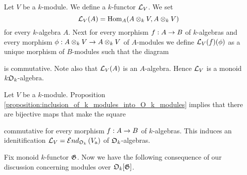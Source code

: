\begin{example}\label{example:general_linear_monoid}
Let $V$ be a $k$-module. We define a $k$-functor ${\mathcal L}_V$. We set
$${\mathcal L}_V(A) = \mathrm{Hom}_A(A\otimes_kV,A\otimes_kV)$$
for every $k$-algebra $A$. Next for every morphism $f:A\rightarrow B$ of $k$-algebras and every morphism $\phi:A\otimes_kV\rightarrow A\otimes_kV$ of $A$-modules we define ${\mathcal L}_V(f)(\phi)$ as a unique morphism of $B$-modules such that the diagram
\begin{center}
\end{center}
is commutative. Note also that ${\mathcal L}_V(A)$ is an $A$-algebra. Hence ${\mathcal L}_V$ is a monoid $k{\mathfrak O}_k$-algebra.
\end{example}

\begin{remark}\label{remark:general_linear_monoid}
Let $V$ be a $k$-module. Proposition \ref{proposition:inclusion_of_k_modules_into_O_k_modules} implies that there are bijective maps that make the square
\begin{center}
\end{center}
commutative for every morphism $f:A\rightarrow B$ of $k$-algebras. This induces an idenitification ${\mathcal L}_V = {\mathcal E} nd_{{\mathfrak O}_k}\left(V_{\mathrm{a}}\right)$ of ${\mathfrak O}_k$-algebras.
\end{remark}
\noindent
Fix monoid $k$-functor ${\mathfrak G}$. Now we have the following consequence of our discussion concerning modules over ${\mathfrak O}_k[{\mathfrak G}]$.

